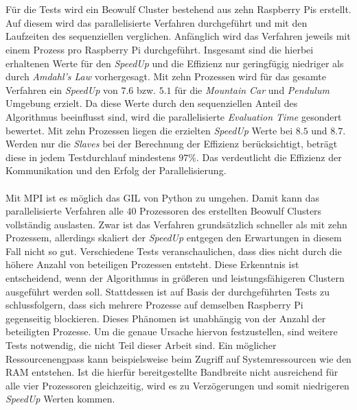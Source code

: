 \\\\
Für die Tests wird ein Beowulf Cluster bestehend aus zehn Raspberry Pis erstellt. Auf diesem wird das parallelisierte Verfahren durchgeführt und mit den Laufzeiten des sequenziellen verglichen. Anfänglich wird das Verfahren jeweils mit einem Prozess pro Raspberry Pi durchgeführt. Insgesamt sind die hierbei erhaltenen Werte für den \emph{SpeedUp} und die Effizienz nur geringfügig niedriger als durch \emph{Amdahl's Law} vorhergesagt. Mit zehn Prozessen wird für das gesamte Verfahren ein \emph{SpeedUp} von $7.6$ bzw. $5.1$ für die \emph{Mountain Car} und \emph{Pendulum} Umgebung erzielt. Da diese Werte durch den sequenziellen Anteil des Algorithmus beeinflusst sind, wird die parallelisierte \emph{Evaluation Time} gesondert bewertet. Mit zehn Prozessen liegen die erzielten \emph{SpeedUp} Werte bei $8.5$ und $8.7$. Werden nur die \emph{Slaves} bei der Berechnung der Effizienz berücksichtigt, beträgt diese in jedem Testdurchlauf mindestens $97\%$. Das verdeutlicht die Effizienz der Kommunikation und den Erfolg der Parallelisierung.
\\\\
Mit \ac{MPI} ist es möglich das \ac{GIL} von Python zu umgehen. Damit kann das parallelisierte Verfahren alle $40$ Prozessoren des erstellten Beowulf Clusters vollständig auslasten. Zwar ist das Verfahren grundsätzlich schneller als mit zehn Prozessem, allerdings skaliert der \emph{SpeedUp} entgegen den Erwartungen in diesem Fall nicht so gut. Verschiedene Tests veranschaulichen, dass dies nicht durch die höhere Anzahl von beteiligen Prozessen entsteht. Diese Erkenntnis ist entscheidend, wenn der Algorithmus in größeren und leistungsfähigeren Clustern ausgeführt werden soll. Stattdessen ist auf Basis der durchgeführten Tests zu schlussfolgern, dass sich mehrere Prozesse auf demselben Raspberry Pi gegenseitig blockieren. Dieses Phänomen ist unabhängig von der Anzahl der beteiligten Prozesse. Um die genaue Ursache hiervon festzustellen, sind weitere Tests notwendig, die nicht Teil dieser Arbeit sind. Ein möglicher Ressourcenengpass kann beispielsweise beim Zugriff auf Systemressourcen wie den \ac{RAM} entstehen. Ist die hierfür bereitgestellte Bandbreite nicht ausreichend für alle vier Prozessoren gleichzeitig, wird es zu Verzögerungen und somit niedrigeren \emph{SpeedUp} Werten kommen. 
\\\\
